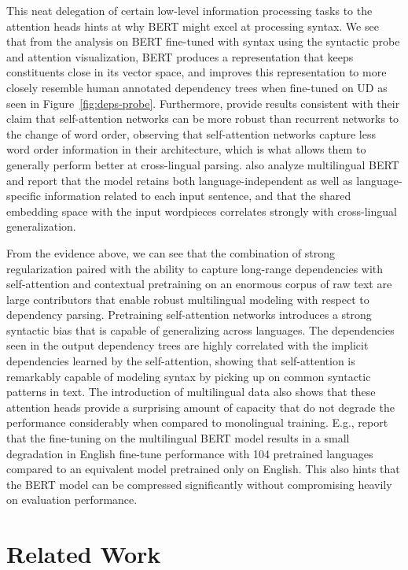 \documentclass[11pt,a4paper]{article}
\begin{document}
This neat delegation of certain low-level information processing tasks to the attention heads hints at why BERT might excel at processing syntax.
We see that from the analysis on BERT fine-tuned with syntax using the syntactic probe and attention visualization, BERT produces a representation that keeps constituents close in its vector space, and improves this representation to more closely resemble human annotated dependency trees when fine-tuned on UD as seen in Figure~\ref{fig:deps-probe}.
Furthermore,  provide results consistent with their claim that self-attention networks can be more robust than recurrent networks to the change of word order, observing that self-attention networks capture less word order information in their architecture, which is what allows them to generally perform better at cross-lingual parsing.
 also analyze multilingual BERT and report that the model retains both language-independent as well as language-specific information related to each input sentence, and that the shared embedding space with the input wordpieces correlates strongly with cross-lingual generalization.

From the evidence above, we can see that the combination of strong regularization paired with the ability to capture long-range dependencies with self-attention and contextual pretraining on an enormous corpus of raw text are large contributors that enable robust multilingual modeling with respect to dependency parsing.
Pretraining self-attention networks introduces a strong syntactic bias that is capable of generalizing across languages.
The dependencies seen in the output dependency trees are highly correlated with the implicit dependencies learned by the self-attention, showing that self-attention is remarkably capable of modeling syntax by picking up on common syntactic patterns in text.
The introduction of multilingual data also shows that these attention heads provide a surprising amount of capacity that do not degrade the performance considerably when compared to monolingual training.
E.g.,  report that the fine-tuning on the multilingual BERT model results in a small degradation in English fine-tune performance with 104 pretrained languages compared to an equivalent model pretrained only on English.
This also hints that the BERT model can be compressed significantly without compromising heavily on evaluation performance.

\section{Related Work} \label{sec:related-work}
\end{document}
